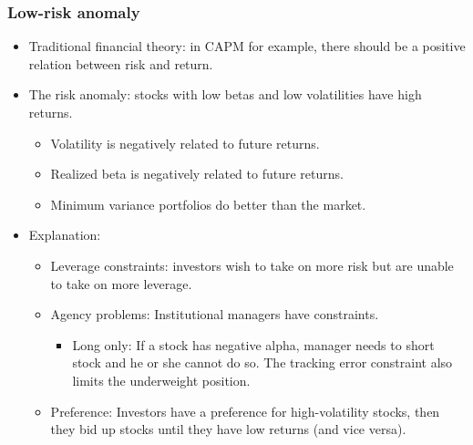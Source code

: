 \subsubsection{Low-risk anomaly}
\begin{itemize}
\item Traditional financial theory: in CAPM for example, there should be a positive relation between risk and return.

    
\item The risk anomaly: stocks with low betas and low volatilities have high returns.
    \begin{itemize}
    \item Volatility is negatively related to future returns.
    \item Realized beta is negatively related to future returns.
    \item Minimum variance portfolios do better than the market.
    \end{itemize}
    
    
\item Explanation:
    \begin{itemize}
    \item Leverage constraints: investors wish to take on more risk but are unable to take on more leverage.
    \item Agency problems: Institutional managers have constraints.
        \begin{itemize}
        \item Long only: If a stock has negative alpha, manager needs to short stock and he or she cannot do so. The tracking error constraint also limits the underweight position.
        \end{itemize}
    \item Preference: Investors have a preference for high-volatility stocks, then they bid up stocks until they have low returns (and vice versa).
    \end{itemize}
    
    
\end{itemize}

